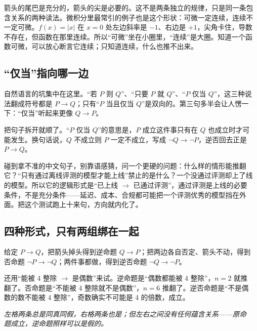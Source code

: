 箭头的尾巴是充分的，箭头的尖是必要的。这不是两条独立的规律，只是同一条包含关系的两种读法。微积分里最常引的例子也是这个形状：可微一定连续，连续不一定可微。\(f(x)=|x|\) 在 \(x=0\) 处左边斜率是 \(-1\)、右边是 \(+1\)，尖角卡住，导数不存在，但函数在那里连续。所以``可微''坐在小圈里，``连续''是大圈。知道一个函数可微，可以放心断言它连续；只知道连续，什么也推不出来。

\subsection{``仅当''指向哪一边}

自然语言的坑集中在这里。``若 \(P\) 则 \(Q\)''、``只要 \(P\) 就 \(Q\)''、``\(P\) 仅当 \(Q\)''，这三种说法翻成符号都是 \(P\to Q\)；只有``\(P\) 当且仅当 \(Q\)''是双向的。第三句多半会让人愣一下：``仅当''听起来更像 \(Q\to P\)。

把句子拆开就顺了。``\(P\) 仅当 \(Q\)''的意思是，\(P\) 成立这件事只有在 \(Q\) 也成立时才可能发生。换句话说，\(Q\) 不成立则 \(P\) 一定不成立，写成 \(\neg Q\to\neg P\)，逆否回去正是 \(P\to Q\)。

碰到拿不准的中文句子，别靠语感猜，问一个更硬的问题：什么样的情形能推翻它？``只有通过离线评测的模型才能上线''禁止的是什么？一个没通过评测却上了线的模型。所以它的逻辑形式是``已上线 \(\to\) 已通过评测''，通过评测是上线的必要条件，不是充分条件——延迟、成本、合规都可能把一个评测优秀的模型挡在外面。把这个测试跑上十来句，方向就内化了。

\subsection{四种形式，只有两组绑在一起}

给定 \(P\to Q\)，把箭头掉头得到逆命题 \(Q\to P\)；把两边各自否定、箭头不动，得到否命题 \(\neg P\to\neg Q\)；两件事都做，得到逆否命题 \(\neg Q\to\neg P\)。

还用``能被 4 整除 \(\to\) 是偶数''来试。逆命题是``偶数都能被 4 整除''，\(n=2\) 就推翻了。否命题是``不能被 4 整除就不是偶数''，\(n=6\) 推翻了。逆否命题是``不是偶数的数不能被 4 整除''，奇数确实不可能是 4 的倍数，成立。

\begin{center}

\emph{左格两条总是同真同假，右格两条也是；但左右之间没有任何蕴含关系——原命题成立，逆命题照样可以是假的。}
\end{center}

